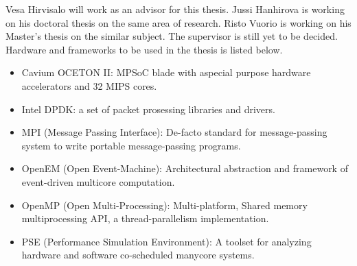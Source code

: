 Vesa Hirvisalo will work as an advisor for this thesis. Jussi Hanhirova is working on his doctoral thesis on the same area of research. Risto Vuorio is working on his Master's thesis on the similar subject. The supervisor is still yet to be decided. Hardware and frameworks to be used in the thesis is listed below.

\begin{itemize}
\item Cavium OCETON II: MPSoC blade with aspecial purpose hardware accelerators and 32 MIPS cores.

\item Intel DPDK: a set of packet prosessing libraries and drivers.

\item MPI (Message Passing Interface): De-facto standard for message-passing system to write portable message-passing programs.

\item OpenEM (Open Event-Machine): Architectural abstraction and framework of event-driven multicore computation.

\item OpenMP (Open Multi-Processing): Multi-platform, Shared memory multiprocessing API, a thread-parallelism implementation.

\item PSE (Performance Simulation Environment): A toolset for analyzing hardware and software co-scheduled manycore systems.
\end{itemize}

